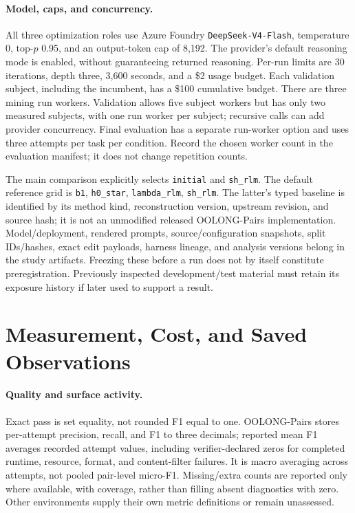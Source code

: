 \paragraph{Model, caps, and concurrency.}
All three optimization roles use Azure Foundry \texttt{DeepSeek-V4-Flash},
temperature 0, top-$p$ 0.95, and an output-token cap of 8,192. The provider's
default reasoning mode is enabled, without guaranteeing returned reasoning.
Per-run limits are 30 iterations, depth three, 3,600 seconds, and a \$2 usage
budget. Each validation subject, including the incumbent, has a \$100 cumulative
budget. There are three mining run workers. Validation allows five subject
workers but has only two measured subjects, with one run worker per subject;
recursive calls can add provider concurrency. Final evaluation has a separate
run-worker option and uses three attempts per task per condition. Record the
chosen worker count in the evaluation manifest; it does not change repetition
counts.

The main comparison explicitly selects \texttt{initial} and \texttt{sh\_rlm}.
The default reference grid is \texttt{b1}, \texttt{h0\_star},
\texttt{lambda\_rlm}, \texttt{sh\_rlm}. The latter's typed baseline is identified
by its method kind, reconstruction version, upstream revision, and source hash;
it is not an unmodified released OOLONG-Pairs implementation. Model/deployment,
rendered prompts, source/configuration snapshots, split IDs/hashes, exact edit
payloads, harness lineage, and analysis versions belong in the study artifacts.
Freezing these before a run does not by itself constitute preregistration.
Previously inspected development/test material must retain its exposure history
if later used to support a result.

\section{Measurement, Cost, and Saved Observations}
\label{app:measurement}
\label{sec:cost}

\paragraph{Quality and surface activity.}
Exact pass is set equality, not rounded F1 equal to one. OOLONG-Pairs stores
per-attempt precision, recall, and F1 to three decimals; reported mean F1 averages
recorded attempt values, including verifier-declared zeros for completed runtime,
resource, format, and content-filter failures. It is macro averaging across
attempts, not pooled pair-level micro-F1. Missing/extra counts are reported only
where available, with coverage, rather than filling absent diagnostics with zero.
Other environments supply their own metric definitions or remain unassessed.

